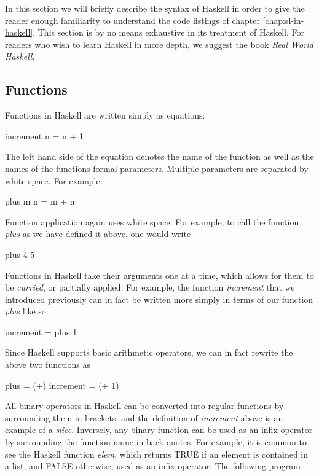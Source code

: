 \documentclass[thesis.tex]{subfiles}
\begin{document}
In this section we will briefly describe the syntax of Haskell in
order to give the reader enough familiarity to understand the code
listings of chapter \ref{chap:sl-in-haskell}. This section is by no
means exhaustive in its treatment of Haskell. For readers who wish to
learn Haskell in more depth, we suggest the book \emph{Real World
  Haskell}.



\subsection{Functions}

Functions in Haskell are written simply as equations:

\begin{spec}
increment n = n + 1
\end{spec}

The left hand side of the equation denotes the name of the function as well as the names of the
functions formal parameters. Multiple parameters are separated by white space. For example:

\begin{spec}
plus m n = m + n
\end{spec}

Function application again uses white space. For example, to call the function \emph{plus} as we have
defined it above, one would write

\begin{spec}
plus 4 5
\end{spec}

Functions in Haskell take their arguments one at a time, which allows for them to be \emph{curried}, or
partially applied. For example, the function \emph{increment} that we introduced previously can in fact
be written more simply in terms of our function \emph{plus} like so:

\begin{spec}
increment = plus 1
\end{spec}

Since Haskell supports basic arithmetic operators, we can in fact rewrite the above two functions as

\begin{spec}
plus = (+)
increment = (+ 1)
\end{spec}

All binary operators in Haskell can be converted into regular functions by surrounding them in brackets,
and the definition of \emph{increment} above is an example of a \emph{slice}. Inversely, any binary function
can be used as an infix operator by surrounding the function name in back-quotes. For example, it is
common to see the Haskell function \emph{elem}, which returns TRUE if an element is contained in a list, and
FALSE otherwise, used as an infix operator. The following program
\end{document}
